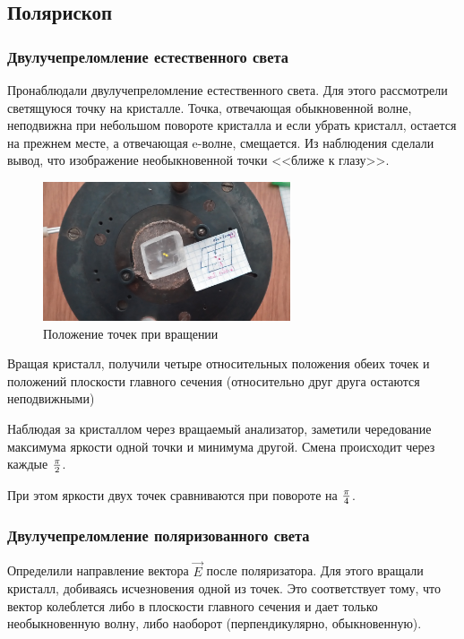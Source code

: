 \subsection{Полярископ}
\subsubsection{Двулучепреломление естественного света}

Пронаблюдали двулучепреломление естественного света. Для этого рассмотрели светящуюся точку на кристалле. Точка, отвечающая обыкновенной волне, неподвижна при небольшом повороте кристалла и если убрать кристалл, остается на прежнем месте, а отвечающая e-волне, смещается. Из наблюдения сделали вывод, что изображение необыкновенной точки <<ближе к глазу>>.

\begin{figure}[H]
	\centering
	\includegraphics[width=0.65\textwidth]{pic/dv.jpg}
	\caption{Положение точек при вращении}
	\label{fig:figure2}
\end{figure}

Вращая кристалл, получили четыре относительных положения обеих точек и положений плоскости главного сечения (относительно друг друга остаются неподвижными)


Наблюдая за кристаллом через вращаемый анализатор, заметили чередование максимума яркости одной точки и минимума другой. Смена происходит через каждые $\pi\over2$.

При этом яркости двух точек сравниваются при повороте на $\pi\over4$.


\subsubsection{Двулучепреломление поляризованного света}

Определили направление вектора $\vec{E}$ после поляризатора. Для этого вращали кристалл, добиваясь исчезновения одной из точек. Это соответствует тому, что вектор колеблется либо в плоскости главного сечения и дает только необыкновенную волну, либо наоборот (перпендикулярно, обыкновенную). 


